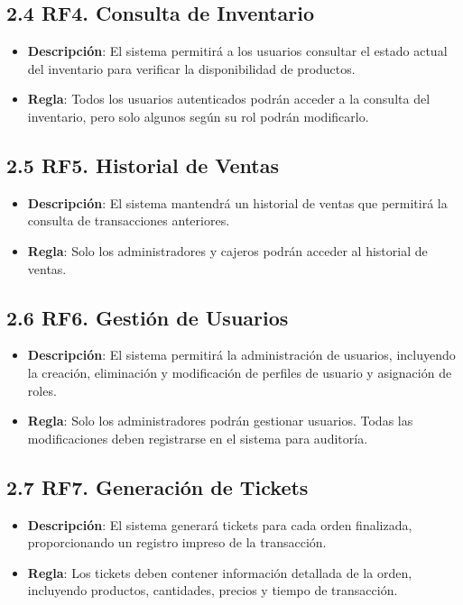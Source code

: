 \documentclass{article}
\begin{document}
\subsection{2.4 RF4. Consulta de Inventario}
\begin{itemize}
    \item \textbf{Descripción}: El sistema permitirá a los usuarios consultar el estado actual del inventario para verificar la disponibilidad de productos.
    \item \textbf{Regla}: Todos los usuarios autenticados podrán acceder a la consulta del inventario, pero solo algunos según su rol podrán modificarlo.
\end{itemize}

\subsection{2.5 RF5. Historial de Ventas}
\begin{itemize}
    \item \textbf{Descripción}: El sistema mantendrá un historial de ventas que permitirá la consulta de transacciones anteriores.
    \item \textbf{Regla}: Solo los administradores y cajeros podrán acceder al historial de ventas.
\end{itemize}

\subsection{2.6 RF6. Gestión de Usuarios}
\begin{itemize}
    \item \textbf{Descripción}: El sistema permitirá la administración de usuarios, incluyendo la creación, eliminación y modificación de perfiles de usuario y asignación de roles.
    \item \textbf{Regla}: Solo los administradores podrán gestionar usuarios. Todas las modificaciones deben registrarse en el sistema para auditoría.
\end{itemize}

\subsection{2.7 RF7. Generación de Tickets}
\begin{itemize}
    \item \textbf{Descripción}: El sistema generará tickets para cada orden finalizada, proporcionando un registro impreso de la transacción.
    \item \textbf{Regla}: Los tickets deben contener información detallada de la orden, incluyendo productos, cantidades, precios y tiempo de transacción.
\end{itemize}
\end{document}
